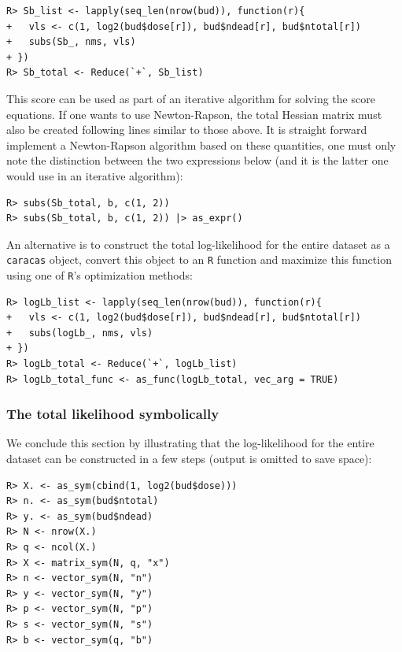 \begin{verbatim}
R> Sb_list <- lapply(seq_len(nrow(bud)), function(r){
+   vls <- c(1, log2(bud$dose[r]), bud$ndead[r], bud$ntotal[r])
+   subs(Sb_, nms, vls) 
+ })
R> Sb_total <- Reduce(`+`, Sb_list)
\end{verbatim}

This score can be used as part of an iterative algorithm for solving the score equations.
If one wants to use Newton-Rapson, the total Hessian matrix must also be created
following lines similar to those above.
It is straight forward implement a Newton-Rapson algorithm based on these
quantities, one must only note the distinction between the two expressions
below (and it is the latter one would use in an iterative algorithm):

\begin{verbatim}
R> subs(Sb_total, b, c(1, 2))
R> subs(Sb_total, b, c(1, 2)) |> as_expr()
\end{verbatim}

An alternative is to construct the total log-likelihood
for the entire dataset as a \texttt{caracas} object, convert this
object to an \texttt{R} function and maximize this
function using one of \texttt{R}'s optimization methods:

\begin{verbatim}
R> logLb_list <- lapply(seq_len(nrow(bud)), function(r){
+   vls <- c(1, log2(bud$dose[r]), bud$ndead[r], bud$ntotal[r])
+   subs(logLb_, nms, vls) 
+ })
R> logLb_total <- Reduce(`+`, logLb_list)
R> logLb_total_func <- as_func(logLb_total, vec_arg = TRUE)
\end{verbatim}

\hypertarget{the-total-likelihood-symbolically}{%
\subsubsection{The total likelihood symbolically}\label{the-total-likelihood-symbolically}}

We conclude this section by illustrating that the log-likelihood for the entire dataset
can be constructed in a few steps (output is omitted to save space):

\begin{verbatim}
R> X. <- as_sym(cbind(1, log2(bud$dose)))
R> n. <- as_sym(bud$ntotal)
R> y. <- as_sym(bud$ndead)
R> N <- nrow(X.)
R> q <- ncol(X.)
R> X <- matrix_sym(N, q, "x")
R> n <- vector_sym(N, "n")
R> y <- vector_sym(N, "y")
R> p <- vector_sym(N, "p")
R> s <- vector_sym(N, "s")
R> b <- vector_sym(q, "b")
\end{verbatim}

